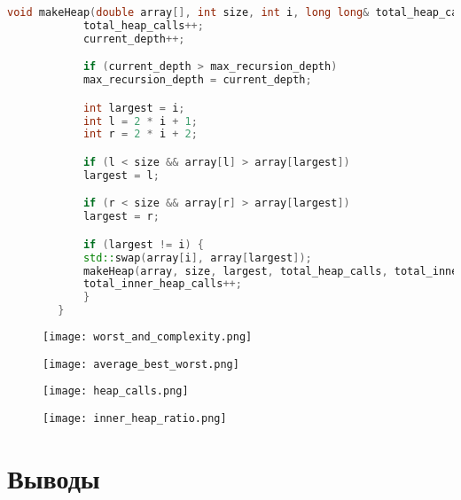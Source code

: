 \documentclass[12pt, a4paper]{report}
\begin{document}
	\begin{lstlisting}[language=C++]
		void makeHeap(double array[], int size, int i, long long& total_heap_calls, long long& total_inner_heap_calls, long long& current_depth, long long& max_recursion_depth) {
		    total_heap_calls++;
		    current_depth++;

		    if (current_depth > max_recursion_depth)
			max_recursion_depth = current_depth;

		    int largest = i;
		    int l = 2 * i + 1;
		    int r = 2 * i + 2;

		    if (l < size && array[l] > array[largest])
			largest = l;

		    if (r < size && array[r] > array[largest])
			largest = r;

		    if (largest != i) {
			std::swap(array[i], array[largest]);
			makeHeap(array, size, largest, total_heap_calls, total_inner_heap_calls, current_depth, max_recursion_depth);
			total_inner_heap_calls++;
		    }
		}
	\end{lstlisting}

	\newpage
	\vfill

	\begin{figure}
		\texttt{[image: worst\_and\_complexity.png]}
	\end{figure}
	\begin{figure}
		\texttt{[image: average\_best\_worst.png]}
	\end{figure}
	\begin{figure}
		\texttt{[image: heap\_calls.png]}
	\end{figure}
	\begin{figure}
		\texttt{[image: inner\_heap\_ratio.png]}
	\end{figure}

	\vfill
	\clearpage

	\section*{Выводы}
\end{document}
